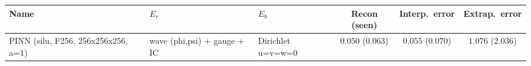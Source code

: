 \begin{center}
\begin{tabular}{lll ccc}
\toprule
Name & $E_r$ & $E_b$ & Recon (seen) & Interp.\ error & Extrap.\ error \\
\midrule
PINN (silu, F256, 256x256x256, a=1) & wave (phi,psi) + gauge + IC & Dirichlet u=v=w=0 & $0.050$ ($0.063$) & $0.055$ ($0.070$) & $1.076$ ($2.036$) \\
\bottomrule
\end{tabular}
\end{center}
